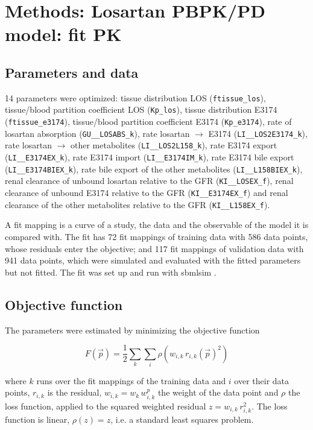 \section{Methods: Losartan PBPK/PD model: fit PK}

\subsection{Parameters and data}

14 parameters were optimized: tissue distribution LOS (\texttt{ftissue\_los}), tissue/blood partition coefficient LOS (\texttt{Kp\_los}), tissue distribution E3174 (\texttt{ftissue\_e3174}), tissue/blood partition coefficient E3174 (\texttt{Kp\_e3174}), rate of losartan absorption (\texttt{GU\_\_LOSABS\_k}), rate losartan \ensuremath{\rightarrow} E3174 (\texttt{LI\_\_LOS2E3174\_k}), rate losartan \ensuremath{\rightarrow} other metabolites (\texttt{LI\_\_LOS2L158\_k}), rate E3174 export (\texttt{LI\_\_E3174EX\_k}), rate E3174 import (\texttt{LI\_\_E3174IM\_k}), rate E3174 bile export (\texttt{LI\_\_E3174BIEX\_k}), rate bile export of the other metabolites (\texttt{LI\_\_L158BIEX\_k}), renal clearance of unbound losartan relative to the GFR (\texttt{KI\_\_LOSEX\_f}), renal clearance of unbound E3174 relative to the GFR (\texttt{KI\_\_E3174EX\_f}) and renal clearance of the other metabolites relative to the GFR (\texttt{KI\_\_L158EX\_f}).

A fit mapping is a curve of a study, the data and the observable of the model it is compared with. The fit has 72 fit mappings of training data with 586 data points, whose residuals enter the objective; and 117 fit mappings of validation data with 941 data points, which were simulated and evaluated with the fitted parameters but not fitted. The fit was set up and run with sbmlsim \cite{Koenig2026_sbmlsim}.

\subsection{Objective function}

The parameters were estimated by minimizing the objective function

\begin{equation}
F(\vec{p}) = \frac{1}{2} \sum_{k} \sum_{i} \rho\left(w_{i,k}\, r_{i,k}(\vec{p})^2\right)
\end{equation}

where $k$ runs over the fit mappings of the training data and $i$ over their data points, $r_{i,k}$ is the residual, $w_{i,k} = w_k\, w^{p}_{i,k}$ the weight of the data point and $\rho$ the loss function, applied to the squared weighted residual $z = w_{i,k}\, r_{i,k}^2$. The loss function is linear, $\rho(z) = z$, i.e. a standard least squares problem.

